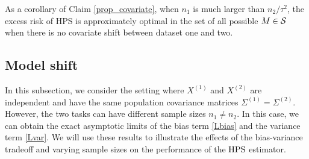 As a corollary of Claim \ref{prop_covariate}, when $n_1$ is much larger than $n_2 / \tau^2$, the excess risk of HPS is approximately optimal in the set of all possible $M\in\mathcal{S}$ when there is no covariate shift between dataset one and two.





\subsection{Model shift}\label{sec_sizeratio}

 In this subsection, we consider the setting where $X^{(1)}$ and $X^{(2)}$ are independent and have the same population covariance matrices $\Sigma^{(1)}=\Sigma^{(2)}$. However, the two tasks can have different sample sizes $n_1\ne n_2$. In this case, we can obtain the exact asymptotic limits of the bias term \eqref{Lbias} and the variance term \eqref{Lvar}. We will use these results to illustrate the effects of the bias-variance tradeoff and varying sample sizes on the performance of the $\textup{HPS}$ estimator.

